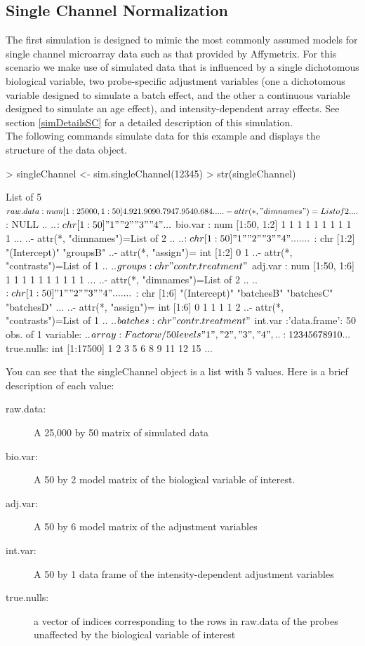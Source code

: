 \documentclass[11pt]{article}
\begin{document}
\subsection{Single Channel Normalization}\label{egSC}
The first simulation is designed to mimic the most commonly assumed models for single channel microarray data such as that provided by Affymetrix.
For this scenario we make use of simulated data that is influenced by a single dichotomous biological variable,
two probe-specific adjustment variables (one a dichotomous variable designed to simulate a batch effect, and the other a continuous 
variable designed to simulate an age effect), and intensity-dependent array effects. See section \ref{simDetailsSC} for a detailed
description of this simulation.\\

The following commands simulate data for this example and displays the structure of the data object.

\begin{Schunk}
\begin{Sinput}
> singleChannel <- sim.singleChannel(12345)
> str(singleChannel)
\end{Sinput}
\begin{Soutput}
List of 5
 $ raw.data  : num [1:25000, 1:50] 4.92 1.909 0.794 7.954 0.684 ...
  ..- attr(*, "dimnames")=List of 2
  .. ..$ : NULL
  .. ..$ : chr [1:50] "1" "2" "3" "4" ...
 $ bio.var   : num [1:50, 1:2] 1 1 1 1 1 1 1 1 1 1 ...
  ..- attr(*, "dimnames")=List of 2
  .. ..$ : chr [1:50] "1" "2" "3" "4" ...
  .. ..$ : chr [1:2] "(Intercept)" "groupsB"
  ..- attr(*, "assign")= int [1:2] 0 1
  ..- attr(*, "contrasts")=List of 1
  .. ..$ groups: chr "contr.treatment"
 $ adj.var   : num [1:50, 1:6] 1 1 1 1 1 1 1 1 1 1 ...
  ..- attr(*, "dimnames")=List of 2
  .. ..$ : chr [1:50] "1" "2" "3" "4" ...
  .. ..$ : chr [1:6] "(Intercept)" "batchesB" "batchesC" "batchesD" ...
  ..- attr(*, "assign")= int [1:6] 0 1 1 1 1 2
  ..- attr(*, "contrasts")=List of 1
  .. ..$ batches: chr "contr.treatment"
 $ int.var   :'data.frame':	50 obs. of  1 variable:
  ..$ array: Factor w/ 50 levels "1","2","3","4",..: 1 2 3 4 5 6 7 8 9 10 ...
 $ true.nulls: int [1:17500] 1 2 3 5 6 8 9 11 12 15 ...
\end{Soutput}
\end{Schunk}

You can see that the singleChannel object is a list with 5 values.  Here is a brief description of each value:
\begin{description}  
\item[raw.data:] A 25,000 by 50 matrix of simulated data
\item[bio.var:] A 50 by 2 model matrix of the biological variable of interest. 
\item[adj.var:] A 50 by 6 model matrix of the adjustment variables
\item[int.var:] A 50 by 1 data frame of the intensity-dependent adjustment variables
\item[true.nulls:] a vector of indices corresponding to the rows in raw.data of the probes unaffected by the biological variable of interest 
\end{description}
\end{document}
